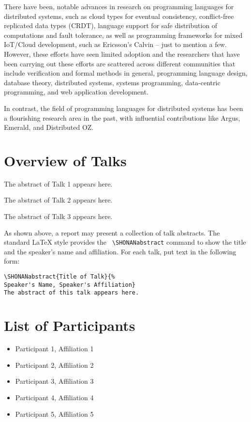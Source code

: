 \documentclass[a4paper]{article}
\begin{document}
There have been, notable advances in research on programming languages for distributed systems, such as cloud types for eventual consistency, conflict-free replicated data types (CRDT), language support for safe distribution of computations and fault tolerance, as well as programming frameworks for mixed IoT/Cloud development, such as Ericsson’s Calvin -- just to mention a few. However, these efforts have seen limited adoption and the researchers that have been carrying out these efforts are scattered across different communities that include verification and formal methods in general, programming language design, database theory, distributed systems, systems programming, data-centric programming, and web application development.

In contrast, the field of programming languages for distributed systems has been a flourishing research area in the past, with influential contributions like Argus, Emerald, and Distributed OZ.

\clearpage


\section*{Overview of Talks}
The abstract of Talk 1 appears here.

The abstract of Talk 2 appears here.

The abstract of Talk 3 appears here.

\bigskip

As shown above, a report may present a collection of talk abstracts.
The standard \LaTeX{} style provides the {\tt
  \textbackslash{}SHONANabstract} command to show the title and the
speaker's name and affiliation.  For each talk, put text in the
following form:
\begin{verbatim}
\SHONANabstract{Title of Talk}{%
Speaker's Name, Speaker's Affiliation}
The abstract of this talk appears here.
\end{verbatim}




\section*{List of Participants}
\begin{itemize}
\item Participant 1, Affiliation 1
\item Participant 2, Affiliation 2
\item Participant 3, Affiliation 3
\item Participant 4, Affiliation 4
\item Participant 5, Affiliation 5
\end{itemize}
\end{document}
